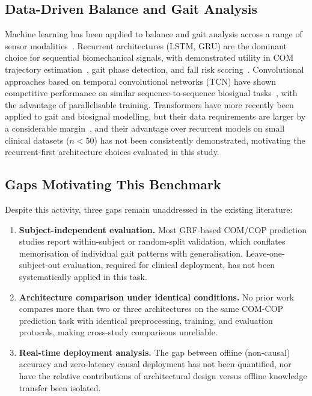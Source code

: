 \documentclass[preprint,12pt]{elsarticle}
\begin{document}
\subsection{Data-Driven Balance and Gait Analysis}

Machine learning has been applied to balance and gait analysis across a range of
sensor modalities~\cite{s23104933,labrozzi2024center}.
Recurrent architectures (LSTM, GRU) are the dominant choice for sequential
biomechanical signals, with demonstrated utility in COM trajectory
estimation~\cite{labrozzi2024center}, gait phase detection, and fall risk
scoring~\cite{s23104933}.
Convolutional approaches based on temporal convolutional networks (TCN) have shown
competitive performance on similar sequence-to-sequence biosignal
tasks~\cite{bai2018empirical}, with the advantage of parallelisable training.
Transformers have more recently been applied to gait and biosignal modelling,
but their data requirements are larger by a considerable margin~\cite{vaswani2017attention},
and their advantage over recurrent models on small clinical datasets ($n < 50$)
has not been consistently demonstrated, motivating the recurrent-first architecture
choices evaluated in this study.

\subsection{Gaps Motivating This Benchmark}

Despite this activity, three gaps remain unaddressed in the existing literature:

\begin{enumerate}
  \item \textbf{Subject-independent evaluation.}
        Most GRF-based COM/COP prediction studies report within-subject or
        random-split validation, which conflates memorisation of individual gait
        patterns with generalisation.
        Leave-one-subject-out evaluation, required for clinical deployment, has not
        been systematically applied in this task.
  \item \textbf{Architecture comparison under identical conditions.}
        No prior work compares more than two or three architectures on the same
        COM-COP prediction task with identical preprocessing, training, and
        evaluation protocols, making cross-study comparisons unreliable.
  \item \textbf{Real-time deployment analysis.}
        The gap between offline (non-causal) accuracy and zero-latency causal
        deployment has not been quantified, nor have the relative contributions of
        architectural design versus offline knowledge transfer been isolated.
\end{enumerate}
\end{document}
